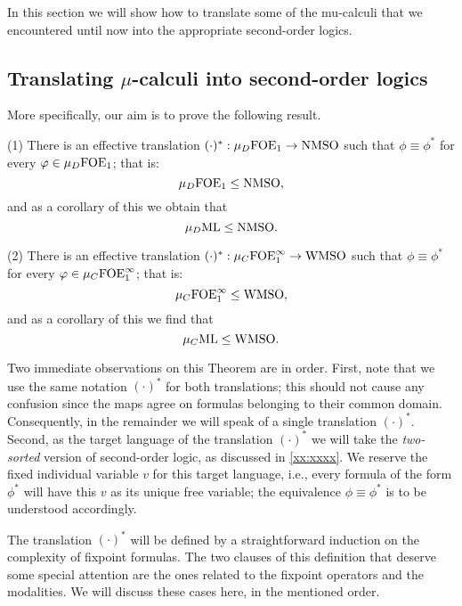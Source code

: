 
In this section we will show how to translate some of the mu-calculi that we
encountered until now into the appropriate second-order logics.

\subsection{Translating $\mu$-calculi into second-order logics}

More specifically, our aim is to prove the following result.

\begin{theorem}
\label{t:mfl2mso}
(1) There is an effective translation $(\cdot)^{*}: \mu_{D}\mathrm{FOE}_1 \to \mathrm{NMSO}$
such that $\phi \equiv \phi^{*}$ for every $\varphi \in \mu_{D}\mathrm{FOE}_1$; that is:
\[
\mu_{D}\mathrm{FOE}_1 \leq \mathrm{NMSO},
\]
and as a corollary of this we obtain that 
\[
\mu_{D}\mathrm{ML} \leq \mathrm{NMSO}.
\]

(2) There is an effective translation $(\cdot)^{*}: \mu_{C}\mathrm{FOE}^{\infty}_1 \to \mathrm{WMSO}$
such that $\phi \equiv \phi^{*}$ for every $\varphi \in \mu_{C}\mathrm{FOE}^{\infty}_1$; that is:
\[
\mu_{C}\mathrm{FOE}^{\infty}_1 \leq \mathrm{WMSO},
\]
and as a corollary of this we find that 
\[
\mu_{C}\mathrm{ML} \leq \mathrm{WMSO}.
\]
\end{theorem}

Two immediate observations on this Theorem are in order.
First, note that we use the same notation $(\cdot)^{*}$ for both translations; 
this should not cause any confusion since the maps agree on formulas belonging 
to their common domain.
Consequently, in the remainder we will speak of a single translation 
$(\cdot)^{*}$.
Second, as the target language of the translation $(\cdot)^{*}$ we will take 
the \emph{two-sorted} version of second-order logic, as discussed in 
\ref{xx:xxxx}.
We reserve the fixed individual variable $v$ for this target language, i.e., 
every formula of the form $\phi^{*}$ will have this $v$ as its unique free 
variable; the equivalence $\phi \equiv \phi^{*}$ is to be understood accordingly.

The translation $(\cdot)^{*}$ will be defined by a straightforward induction on
the complexity of fixpoint formulas.
The two clauses of this definition that deserve some special attention are the
ones related to the fixpoint operators and the modalities.
We will discuss these cases here, in the mentioned order.

